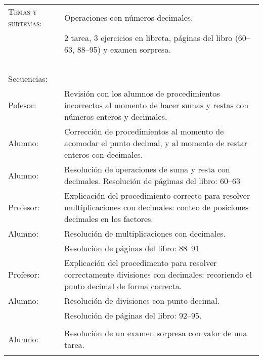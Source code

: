 \documentclass[letterpaper,10pt]{article}
\begin{document}
\begin{tabular}[t]{R{0.25\textwidth}p{0.71\textwidth}}
    \textsc{Temas y subtemas:}          & Operaciones con n\'umeros decimales.\\
              & 2 tarea, 3 ejercicios en libreta, p\'aginas del libro (60--63, 88--95) y examen sorpresa. \\ \\
    \large{\sc Secuencias:} \\
    Pofesor:    & Revisi\'on con los alumnos de procedimientos incorrectos al momento de hacer sumas y restas con n\'umeros enteros y decimales. \\
    Alumno:     & Correcci\'on de procedimientos al momento de acomodar el punto decimal, y al momento de restar enteros con decimales.\\
    Alumno:     & Resoluci\'on de operaciones de suma y resta con decimales. Resolución de p\'agimas del libro: 60--63 \\
    Profesor:   & Explicaci\'on del procedimiento correcto para resolver multiplicaciones con decimales: conteo de posiciones decimales en los factores. \\

    Alumno:     & Resoluci\'on de multiplicaciones con decimales. \\
                & Resoluci\'on de p\'aginas del libro: 88--91 \\
    Profesor:   & Explicaci\'on del procedimento para resolver correctamente divisiones con decimales: recoriendo el punto decimal de forma correcta. \\
    Alumno:     & Resoluci\'on de divisiones con punto decimal. \\ 
                & Resoluci\'on de p\'aginas del libro: 92--95. \\ \\
    Alumno:     & Resoluci\'on de un examen sorpresa con valor de una tarea.
\\ \hline \\
\end{tabular}
\end{document}
